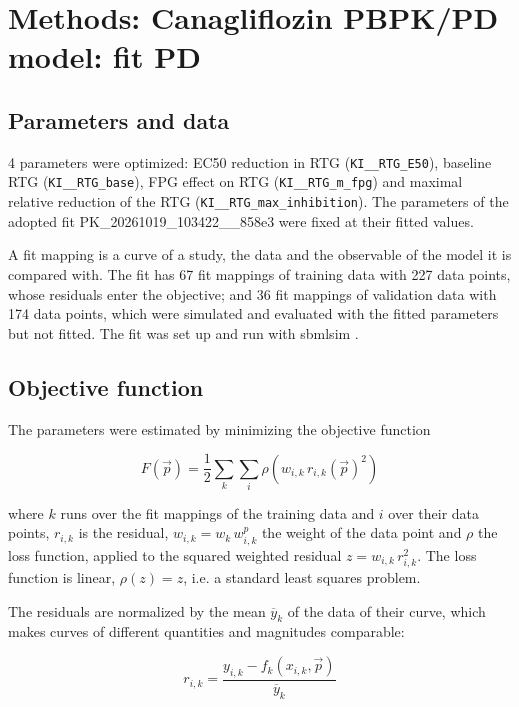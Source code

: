 \section{Methods: Canagliflozin PBPK/PD model: fit PD}

\subsection{Parameters and data}

4 parameters were optimized: EC50 reduction in RTG (\texttt{KI\_\_RTG\_E50}), baseline RTG (\texttt{KI\_\_RTG\_base}), FPG effect on RTG (\texttt{KI\_\_RTG\_m\_fpg}) and maximal relative reduction of the RTG (\texttt{KI\_\_RTG\_max\_inhibition}). The parameters of the adopted fit PK\_20261019\_103422\_\_858e3 were fixed at their fitted values.

A fit mapping is a curve of a study, the data and the observable of the model it is compared with. The fit has 67 fit mappings of training data with 227 data points, whose residuals enter the objective; and 36 fit mappings of validation data with 174 data points, which were simulated and evaluated with the fitted parameters but not fitted. The fit was set up and run with sbmlsim \cite{Koenig2026_sbmlsim}.

\subsection{Objective function}

The parameters were estimated by minimizing the objective function

\begin{equation}
F(\vec{p}) = \frac{1}{2} \sum_{k} \sum_{i} \rho\left(w_{i,k}\, r_{i,k}(\vec{p})^2\right)
\end{equation}

where $k$ runs over the fit mappings of the training data and $i$ over their data points, $r_{i,k}$ is the residual, $w_{i,k} = w_k\, w^{p}_{i,k}$ the weight of the data point and $\rho$ the loss function, applied to the squared weighted residual $z = w_{i,k}\, r_{i,k}^2$. The loss function is linear, $\rho(z) = z$, i.e. a standard least squares problem.

The residuals are normalized by the mean $\overline{y}_k$ of the data of their curve, which makes curves of different quantities and magnitudes comparable:

\begin{equation}
r_{i,k} = \frac{y_{i,k} - f_k(x_{i,k}, \vec{p})}{\overline{y}_k}
\end{equation}

